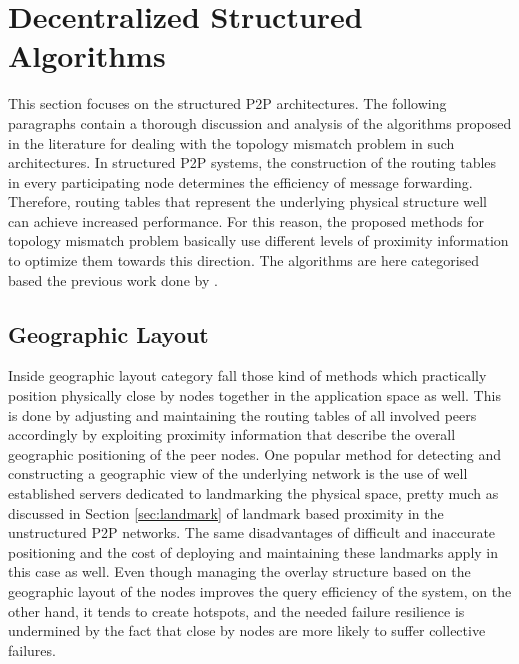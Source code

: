 \section{Decentralized Structured Algorithms}
\label{section:structured}

This section focuses on the structured P2P architectures. The following
paragraphs contain a thorough discussion and analysis of the algorithms proposed
in the literature for dealing with the topology mismatch problem in such
architectures. In structured P2P systems, the construction of the routing tables
in every participating node determines the efficiency of message forwarding.
Therefore, routing tables that represent the underlying physical structure well
can achieve increased performance. For this reason, the proposed methods for
topology mismatch problem basically use different levels of proximity
information to optimize them towards this direction. The algorithms are here
categorised based the previous work done by
\cite{castro_proximitydht_2002,castro_topawareroute_2002,ratnasamy_openq_2002}.


\subsection{Geographic Layout}

Inside geographic layout category fall those kind of methods which practically
position physically close by nodes together in the application space as well.
This is done by adjusting and maintaining the routing tables of all involved
peers accordingly by exploiting proximity information that describe the overall
geographic positioning of the peer nodes. One popular method for detecting and
constructing a geographic view of the underlying network is the use of well
established servers dedicated to landmarking the physical space, pretty much as
discussed in Section \ref{sec:landmark} of landmark based proximity in the
unstructured P2P networks. The same disadvantages of difficult and inaccurate
positioning and the cost of deploying and maintaining these landmarks apply in
this case as well.
Even though managing the overlay structure based on the geographic layout of the
nodes improves the query efficiency of the system, on the other hand, it tends
to create hotspots, and the needed failure resilience is undermined by the fact
that close by nodes are more likely to suffer collective failures.

